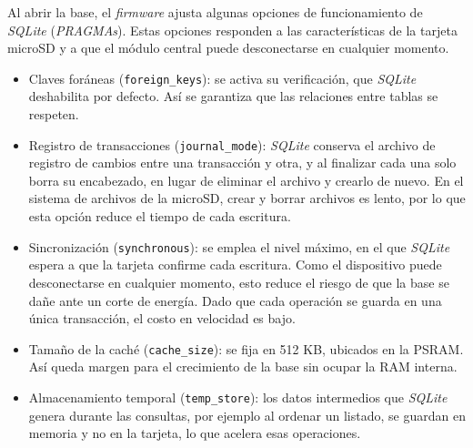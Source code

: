 Al abrir la base, el \emph{firmware} ajusta algunas opciones de funcionamiento de \emph{SQLite} (\emph{PRAGMAs}). Estas opciones responden a las características de la tarjeta microSD y a que el módulo central puede desconectarse en cualquier momento.

\begin{itemize}

\item Claves foráneas (\texttt{foreign\_keys}): se activa su verificación, que \emph{SQLite} deshabilita por defecto. Así se garantiza que las relaciones entre tablas se respeten.

\item Registro de transacciones (\texttt{journal\_mode}): \emph{SQLite} conserva el archivo de registro de cambios entre una transacción y otra, y al finalizar cada una solo borra su encabezado, en lugar de eliminar el archivo y crearlo de nuevo. En el sistema de archivos de la microSD, crear y borrar archivos es lento, por lo que esta opción reduce el tiempo de cada escritura.

\item Sincronización (\texttt{synchronous}): se emplea el nivel máximo, en el que \emph{SQLite} espera a que la tarjeta confirme cada escritura. Como el dispositivo puede desconectarse en cualquier momento, esto reduce el riesgo de que la base se dañe ante un corte de energía. Dado que cada operación se guarda en una única transacción, el costo en velocidad es bajo.

\item Tamaño de la caché (\texttt{cache\_size}): se fija en 512 KB, ubicados en la PSRAM. Así queda margen para el crecimiento de la base sin ocupar la RAM interna.

\item Almacenamiento temporal (\texttt{temp\_store}): los datos intermedios que \emph{SQLite} genera durante las consultas, por ejemplo al ordenar un listado, se guardan en memoria y no en la tarjeta, lo que acelera esas operaciones.

\end{itemize}

